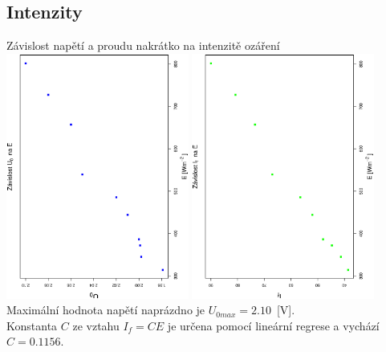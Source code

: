 \documentclass[10pt]{article}
\begin{document}
\subsection{Intenzity}
Závislost napětí a proudu nakrátko na intenzitě ozáření \\
\includegraphics[width=6cm,angle=270]{graf1.eps}
\includegraphics[width=6cm,angle=270]{graf2.eps} \\[1cm]

\noindent
Maximální hodnota napětí naprázdno je $U_{0max} = 2.10$~[V]. \\
Konstanta $C$ ze vztahu $I_f = CE$ je určena pomocí lineární regrese a vychází
$C = 0.1156$.
\end{document}
